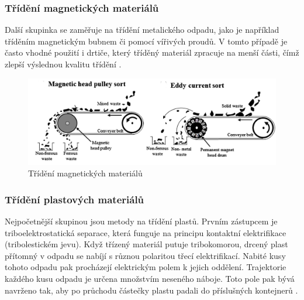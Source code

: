 \documentclass[a4paper,10pt]{article}
\theoremstyle{definition}
\begin{document}
\subsubsection*{Třídění magnetických materiálů}
Další skupinka se zaměřuje na třídění metalického odpadu, jako je například tříděním magnetickým bubnem či pomocí vířivých proudů. V tomto případě je často vhodné použití i drtiče, který tříděný materiál zpracuje na menší části, čímž zlepší výslednou kvalitu třídění \cite{GUNDUPALLI201756} \cite{hansen2007effects} \cite{bonifazi2012recycling}.\\

\begin{figure}[H]
\begin{center}
\includegraphics[scale=0.95]{Images/Magnet.jpg}
\caption{Třídění magnetických materiálů \cite{inproceedings}}
\label{fig:1}
\end{center}
\end{figure}

\newpage
\subsubsection*{Třídění plastových materiálů}
Nejpočetnější skupinou jsou metody na třídění plastů. Prvním zástupcem je triboelektrostatická separace, která funguje na principu kontaktní elektrifikace (tribolestickém jevu). Když třízený materiál putuje tribokomorou, drcený plast přítomný v odpadu se nabíjí s různou polaritou třecí elektrifikací. Nabité kusy tohoto odpadu pak procházejí elektrickým polem k jejich oddělení. Trajektorie každého kusu odpadu je určena množstvím neseného náboje. Toto pole pak bývá navrženo tak, aby po průchodu částečky plastu padali do příslušných kontejnerů \cite{GUNDUPALLI201756} \cite{li2015tribo}.\\
\end{document}
